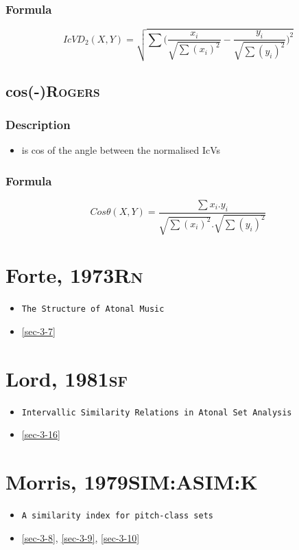 \documentclass[11pt]{article}
\begin{document}
\subsubsection{Formula}
\label{sec-3-27-2}
$$ IcVD_2(X,Y)=\sqrt{\sum{( \frac{x_i}{\sqrt{\sum(x_i)^2}}}-\frac{y_i}{\sqrt{\sum(y_i)^2}})^2} $$

\subsection{cos(-)\hfill{}\textsc{Rogers}}
\label{sec-3-28}
\subsubsection{Description}
\label{sec-3-28-1}
\begin{itemize}
\item is cos of the angle between the normalised IcVs
\end{itemize}

\subsubsection{Formula}
\label{sec-3-28-2}
$$ Cos\theta(X,Y)=\frac{\sum{x_i.y_i}}{\sqrt{\sum{(x_i)^2}}.\sqrt{\sum{(y_i)^2}}} $$

\section{Forte, 1973\hfill{}\textsc{Rn}}
\label{sec-4}
\begin{itemize}
\item \texttt{The Structure of Atonal Music}
\item \ref{sec-3-7}
\end{itemize}

\section{Lord, 1981\hfill{}\textsc{sf}}
\label{sec-5}
\begin{itemize}
\item \texttt{Intervallic Similarity Relations in Atonal Set Analysis}
\item \ref{sec-3-16}
\end{itemize}

\section{Morris, 1979\hfill{}\textsc{SIM:ASIM:K}}
\label{sec-6}
\begin{itemize}
\item \texttt{A similarity index for pitch-class sets}
\item \ref{sec-3-8}, \ref{sec-3-9}, \ref{sec-3-10}
\end{itemize}
\end{document}
